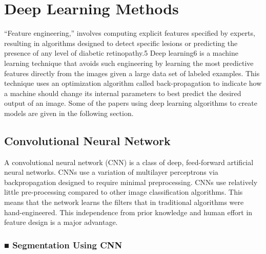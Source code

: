 \documentclass[12pt]{report}
\begin{document}
\section{Deep Learning Methods}
“Feature engineering,” involves computing explicit features specified by experts, resulting in algorithms designed to detect specific lesions or predicting the presence of any level of diabetic retinopathy.5 Deep learning6 is a machine learning technique that avoids such engineering by learning the most predictive features directly from the images given a large data set of labeled examples. This technique uses an optimization algorithm called back-propagation to indicate how a machine should change its internal parameters to best predict the desired output of an image. Some of the papers using deep learning algorithms to create models are given in the following section.

\subsection{Convolutional Neural Network}


A convolutional neural network (CNN) is a class of deep, feed-forward artificial neural networks. CNNs use a variation of multilayer perceptrons via backpropagation designed to require minimal preprocessing. CNNs use relatively little pre-processing compared to other image classification algorithms. This means that the network learns the filters that in traditional algorithms were hand-engineered. This independence from prior knowledge and human effort in feature design is a major advantage.




\subsubsection{■ Segmentation Using CNN}
\end{document}
